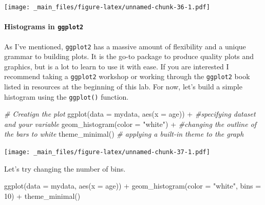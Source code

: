 \documentclass[
]{book}
\newenvironment{Shaded}{\begin{snugshade}}{\end{snugshade}}
\newcommand{\AttributeTok}[1]{\textcolor[rgb]{0.77,0.63,0.00}{#1}}
\newcommand{\CommentTok}[1]{\textcolor[rgb]{0.56,0.35,0.01}{\textit{#1}}}
\newcommand{\DecValTok}[1]{\textcolor[rgb]{0.00,0.00,0.81}{#1}}
\newcommand{\FunctionTok}[1]{\textcolor[rgb]{0.00,0.00,0.00}{#1}}
\newcommand{\NormalTok}[1]{#1}
\newcommand{\SpecialCharTok}[1]{\textcolor[rgb]{0.00,0.00,0.00}{#1}}
\newcommand{\StringTok}[1]{\textcolor[rgb]{0.31,0.60,0.02}{#1}}
\begin{document}
\texttt{[image: \_main\_files/figure-latex/unnamed-chunk-36-1.pdf]}

\hypertarget{histgg}{%
\paragraph*{\texorpdfstring{Histograms in \texttt{ggplot2}}{Histograms in ggplot2}}\label{histgg}}

As I've mentioned, \texttt{ggplot2} has a massive amount of flexibility and a unique grammar to building plots. It is the go-to package to produce quality plots and graphics, but is a lot to learn to use it with ease. If you are interested I recommend taking a \texttt{ggplot2} workshop or working through the \texttt{ggplot2} book listed in resources at the beginning of this lab. For now, let's build a simple histogram using the \texttt{ggplot()} function.

\begin{Shaded}
\begin{Highlighting}[]
\CommentTok{\# Creatign the plot}
\FunctionTok{ggplot}\NormalTok{(}\AttributeTok{data =}\NormalTok{ mydata, }\FunctionTok{aes}\NormalTok{(}\AttributeTok{x =}\NormalTok{ age)) }\SpecialCharTok{+} \CommentTok{\#specifying dataset and your variable}
  \FunctionTok{geom\_histogram}\NormalTok{(}\AttributeTok{color =} \StringTok{"white"}\NormalTok{) }\SpecialCharTok{+} \CommentTok{\#changing the outline of the bars to white}
  \FunctionTok{theme\_minimal}\NormalTok{() }\CommentTok{\# applying a built{-}in theme to the graph}
\end{Highlighting}
\end{Shaded}

\texttt{[image: \_main\_files/figure-latex/unnamed-chunk-37-1.pdf]}

Let's try changing the number of bins.

\begin{Shaded}
\begin{Highlighting}[]
\FunctionTok{ggplot}\NormalTok{(}\AttributeTok{data =}\NormalTok{ mydata, }\FunctionTok{aes}\NormalTok{(}\AttributeTok{x =}\NormalTok{ age)) }\SpecialCharTok{+}
  \FunctionTok{geom\_histogram}\NormalTok{(}\AttributeTok{color =} \StringTok{"white"}\NormalTok{, }\AttributeTok{bins =} \DecValTok{10}\NormalTok{) }\SpecialCharTok{+}
  \FunctionTok{theme\_minimal}\NormalTok{()}
\end{Highlighting}
\end{Shaded}
\end{document}
